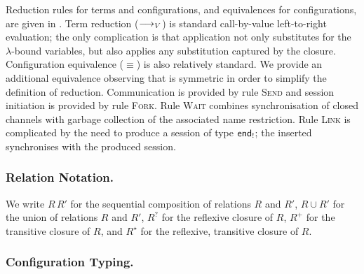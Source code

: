 \documentclass[oribibl,orivec,envcountsame]{llncs}
\begin{document}
Reduction rules for terms and configurations, and equivalences for configurations, are given in
. Term reduction ($\longrightarrow_V$) is standard call-by-value left-to-right evaluation;
the only complication is that application not only substitutes for the $\lambda$-bound variables,
but also applies any substitution captured by the closure. Configuration equivalence ($\equiv$) is
also relatively standard. We provide an additional equivalence observing that  is
symmetric in order to simplify the definition of reduction. Communication is provided by rule
\textsc{Send} and session initiation is provided by rule \textsc{Fork}. Rule \textsc{Wait} combines
synchronisation of closed channels with garbage collection of the associated name restriction.  Rule
\textsc{Link} is complicated by the need to produce a session of type $\mathsf{end}_!$; the inserted
 synchronises with the produced session.


\subsubsection{Relation Notation.}
We write $R\,R'$ for the sequential composition of relations $R$ and $R'$, $R \cup R'$ for the union
of relations $R$ and $R'$, $R^?$ for the reflexive closure of $R$, $R^+$ for the transitive closure
of $R$, and $R^\star$ for the reflexive, transitive closure of $R$.

\subsubsection{Configuration Typing.}
\end{document}
